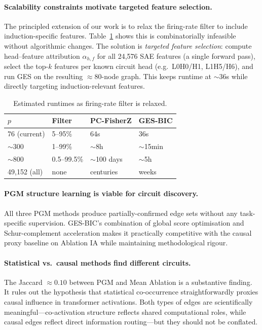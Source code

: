\documentclass{article}
\begin{document}
\paragraph{Scalability constraints motivate targeted feature selection.}
The principled extension of our work is to relax the firing-rate filter
to include induction-specific features. Table~\ref{tab:complexity} shows this
is combinatorially infeasible without algorithmic changes. The solution is
\emph{targeted feature selection}: compute head--feature attribution
$\alpha_{h,f}$ for all 24,576 SAE features (a single forward pass), select
the top-$k$ features per known circuit head (e.g.\ L0H0/H1, L1H5/H6), and
run GES on the resulting $\approx 80$-node graph. This keeps runtime at $\sim$36s
while directly targeting induction-relevant features.

\begin{table}[h]
\centering
\caption{Estimated runtimes as firing-rate filter is relaxed.}
\label{tab:complexity}
\small
\begin{tabular}{llll}
\toprule
$p$ & Filter & PC-FisherZ & GES-BIC \\
\midrule
76 (current) & 5--95\%    & 64s      & 36s \\
$\sim$300    & 1--99\%    & $\sim$8h & $\sim$15min \\
$\sim$800    & 0.5--99.5\%& $\sim$100 days & $\sim$5h \\
49,152 (all) & none       & centuries & weeks \\
\bottomrule
\end{tabular}
\end{table}

\paragraph{PGM structure learning is viable for circuit discovery.}
All three PGM methods produce partially-confirmed edge sets without any
task-specific supervision. GES-BIC's combination of global score optimisation
and Schur-complement acceleration makes it practically competitive with the
causal proxy baseline on Ablation IA while maintaining methodological rigour.

\paragraph{Statistical vs.\ causal methods find different circuits.}
The Jaccard $\approx 0.10$ between PGM and Mean Ablation is a substantive
finding. It rules out the hypothesis that statistical co-occurrence
straightforwardly proxies causal influence in transformer activations. Both
types of edges are scientifically meaningful---co-activation structure reflects
shared computational roles, while causal edges reflect direct information
routing---but they should not be conflated.
\end{document}
